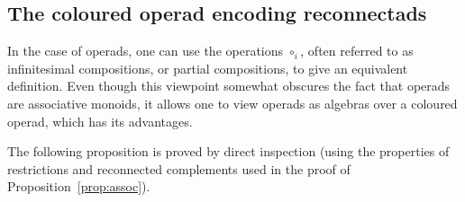 \subsection{The coloured operad encoding reconnectads}

In the case of operads, one can use the operations $\circ_i$, often referred to as infinitesimal compositions, or partial compositions, to give an equivalent definition. Even though this viewpoint somewhat obscures the fact that operads are associative monoids, it allows one to view operads as algebras over a coloured operad, which has its advantages.

The following proposition is proved by direct inspection (using the properties of restrictions and reconnected complements used in the proof of Proposition~\ref{prop:assoc}).

